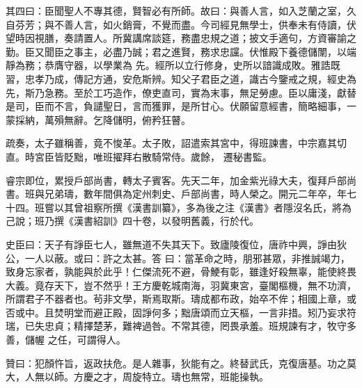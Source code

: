 \begin{pinyinscope}
 其四曰：臣聞聖人不專其德，賢智必有所師。故曰：與善人言，如入芝蘭之室，久自芬芳；與不善人言，如火銷膏，不覺而盡。今司經見無學士，供奉未有侍讀，伏望時因視膳，奏請置人。所冀講席談筵，務盡忠規之道；披文手適句，方資審諭之勤。臣又聞臣之事主，必盡乃誠；君之進賢，務求忠讜。伏惟殿下養德儲闈，以端靜為務；恭膺守器，以學業為
 先。經所以立行修身，史所以諳識成敗。雅誥既習，忠孝乃成，傳記方通，安危斯辨。知父子君臣之道，識古今鑒戒之規，經史為先，斯乃急務。至於工巧造作，僚吏直司，實為末事，無足勞慮。臣以庸淺，獻替是司，臣而不言，負譴聖日，言而獲罪，是所甘心。伏願留意經書，簡略細事，一蒙採納，萬殞無辭。乞降儲明，俯矜狂瞽。



 疏奏，太子雖稱善，竟不悛革。太子敗，詔遣索其宮中，得班諫書，中宗嘉其切直。時宮臣皆貶黜，唯班擢拜右散騎常侍。歲餘，
 遷秘書監。



 睿宗即位，累授戶部尚書，轉太子賓客。先天二年，加金紫光祿大夫，復拜戶部尚書。班與兄弟璹，數年間俱為定州刺史、戶部尚書，時人榮之。開元二年卒，年七十四。班嘗以其曾祖察所撰《漢書訓纂》，多為後之注《漢書》者隱沒名氏，將為己說；班乃撰《漢書紹訓》四十卷，以發明舊義，行於代。



 史臣曰：天子有諍臣七人，雖無道不失其天下。致廬陵復位，唐祚中興，諍由狄公，一人以蔽。或曰：許之太甚。答
 曰：當革命之時，朋邪甚眾，非推誠竭力，致身忘家者，孰能與於此乎！仁傑流死不避，骨鯁有彰，雖逢好殺無辜，能使終畏大義。竟存天下，豈不然乎！王方慶乾城南海，羽冀東宮，臺閣樞機，無不功濟，所謂君子不器者也。茍非文學，斯焉取斯。璹成都布政，始卒不侔；相國上章，或否或中。且焚明堂而避正殿，固諍何多；黜唐頌而立天樞，一言非措。矧乃妄求符瑞，已失忠貞；精擇楚茅，難裨過咎。不常其德，罔畏承羞。班規諫有才，牧守多善，儲幄
 之任，可謂得人。



 贊曰：犯顏忤旨，返政扶危。是人雜事，狄能有之。終替武氏，克復唐基。功之莫大，人無以師。方慶之才，周旋特立。璹也無常，班能操執。



\end{pinyinscope}